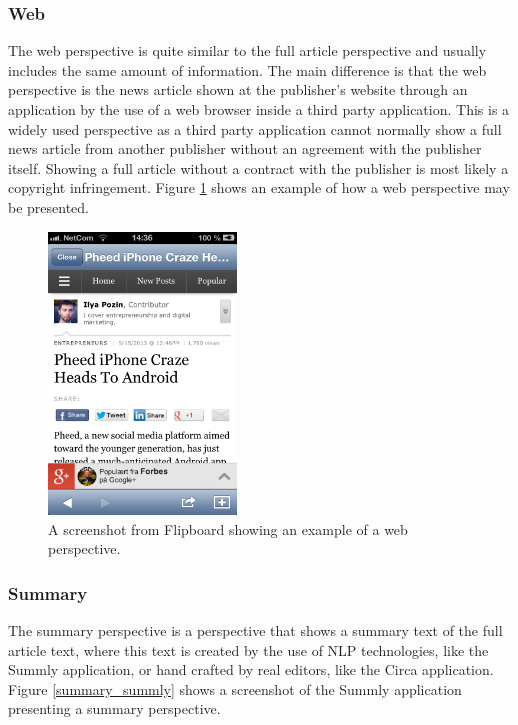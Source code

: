 \subsubsection{Web}
The web perspective is quite similar to the full article perspective and usually includes the same amount of information. The main difference is that the web perspective is the news article shown at the publisher's website through an application by the use of a web browser inside a third party application. This is a widely used perspective as a third party application cannot normally show a full news article from another publisher without an agreement with the publisher itself. Showing a full article without a contract with the publisher is most likely a copyright infringement. Figure \ref{web_flipboard} shows an example of how a web perspective may be presented.

\begin{figure}[!htbp]
\centering
\includegraphics[width=50mm]{GFX/perspectives/webViewFlipboard.png}
\caption{A screenshot from Flipboard showing an example of a web perspective.}
\label{web_flipboard}
\end{figure}

\subsubsection{Summary}
The summary perspective is a perspective that shows a summary text of the full article text, where this text is created by the use of NLP technologies, like the Summly application, or hand crafted by real editors, like the Circa application. Figure \ref{summary_summly} shows a screenshot of the Summly application presenting a summary perspective.

